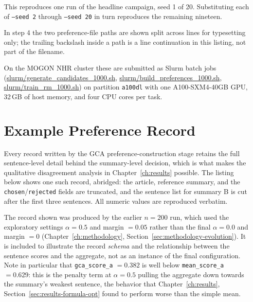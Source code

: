 \noindent
This reproduces one run of the headline campaign, seed 1 of 20. Substituting
each of \texttt{--seed 2} through \texttt{--seed 20} in turn reproduces the
remaining nineteen.

\noindent
In step 4 the two preference-file paths are shown split across lines for
typesetting only; the trailing backslash inside a path is a line continuation in
this listing, not part of the filename.

On the MOGON NHR cluster these are submitted as Slurm batch jobs
(\url{slurm/generate_candidates_1000.sh}, \url{slurm/build_preferences_1000.sh},
\url{slurm/train_rm_1000.sh}) on partition \texttt{a100dl} with one
A100-SXM4-40GB GPU, 32\,GB of host memory, and four CPU cores per task.

\chapter{Example Preference Record}
\label{app:example-record}

Every record written by the GCA preference-construction stage retains the full
sentence-level detail behind the summary-level decision, which is what makes the
qualitative disagreement analysis in Chapter~\ref{ch:results} possible. The
listing below shows one such record, abridged: the article, reference summary, and the
\texttt{chosen}/\texttt{rejected} fields are truncated, and the sentence list for
summary B is cut after the first three sentences. All numeric values are
reproduced verbatim.

The record shown was produced by the earlier $n=200$ run, which used the
exploratory settings $\alpha = 0.5$ and margin $=0.05$ rather than the final
$\alpha = 0.0$ and margin $=0$ (Chapter~\ref{ch:methodology},
Section~\ref{sec:methodology-evolution}). It is included to illustrate the record
\emph{schema} and the relationship between the sentence scores and the aggregate,
not as an instance of the final configuration. Note in particular that
\texttt{gca\_score\_a} $=0.382$ is well below \texttt{mean\_score\_a} $=0.629$:
this is the penalty term at $\alpha = 0.5$ pulling the aggregate down towards the
summary's weakest sentence, the behavior that Chapter~\ref{ch:results},
Section~\ref{sec:results-formula-opt} found to perform worse than the simple mean.

